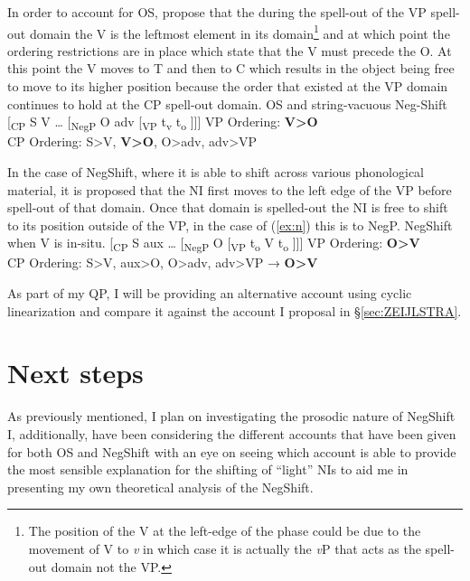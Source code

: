 \documentclass[12pt, letterpaper]{article}
\begin{document}
In order to account for OS, \citeauthor{foxCyclicLinearizationSyntactic2005} propose that the during the spell-out of the VP spell-out domain the V is the leftmost element in its domain\footnote{The position of the V at the left-edge of the phase could be due to the movement of V to \textit{v} in which case it is actually the \textit{v}P that acts as the spell-out domain not the VP.} and at which point the ordering restrictions are in place which state that the V must precede the O. At this point the V moves to T and then to C which results in the object being free to move to its higher position because the order that existed at the VP domain continues to hold at the CP spell-out domain. 
\ea OS and string-vacuous Neg-Shift
\vspace{6pt}
 	\ea {}[\textsubscript{CP} S V … [\textsubscript{NegP} O adv [\textsubscript{VP} t\textsubscript{v} t\textsubscript{o} ]]]
	\vspace{6pt}
	\ex VP Ordering: \textbf{V>O}\\
		CP Ordering: S>V, \textbf{V>O}, O>adv, adv>VP
	\z
\z

In the case of NegShift, where it is able to shift across various phonological material, it is proposed that the NI first moves to the left edge of the VP before spell-out of that domain. Once that domain is spelled-out the NI is free to shift to its position outside of the VP, in the case of (\ref{ex:n}) this is to NegP.
	\ea NegShift when V is in-situ. \label{ex:n}
	\vspace{6pt}
		\ea {}[\textsubscript{CP} S aux … [\textsubscript{NegP} O [\textsubscript{VP} t\textsubscript{o}  V t\textsubscript{o} ]]]
		\ex VP Ordering: \textbf{O>V}\\
		CP Ordering: S>V, aux>O, O>adv, adv>VP → \textbf{O>V}
		\z 
	\z

As part of my QP, I will be providing an alternative account using cyclic linearization and compare it against the account I proposal in §\ref{sec:ZEIJLSTRA}.





\section{Next steps} 

As previously mentioned, I plan on investigating the prosodic nature of NegShift I, additionally, have been considering the different accounts that have been given for both OS and NegShift with an eye on seeing which account is able to provide the most sensible explanation for the shifting of ``light'' NIs to aid me in presenting my own theoretical analysis of the NegShift.

\printbibliography[heading=bibintoc]
\end{document}
